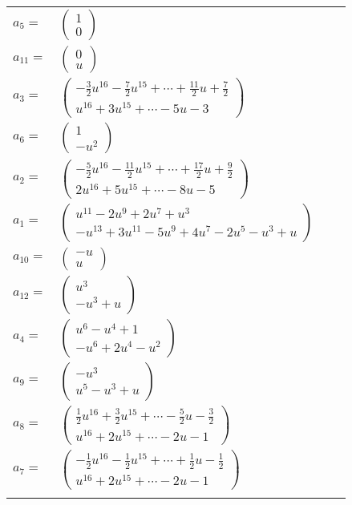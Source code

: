 \documentclass[1p]{elsarticle_modified}
\theoremstyle{definition}
\begin{document}
\begin{tabular}{m{7pt} m{180pt} m{7pt} m{180pt} }
\flushright $a_{5}=$&$\begin{pmatrix}1\\0\end{pmatrix}$ \\
\flushright $a_{11}=$&$\begin{pmatrix}0\\u\end{pmatrix}$ \\
\flushright $a_{3}=$&$\begin{pmatrix}-\frac{3}{2} u^{16}-\frac{7}{2} u^{15}+\cdots+\frac{11}{2} u+\frac{7}{2}\\u^{16}+3 u^{15}+\cdots-5 u-3\end{pmatrix}$ \\
\flushright $a_{6}=$&$\begin{pmatrix}1\\- u^2\end{pmatrix}$ \\
\flushright $a_{2}=$&$\begin{pmatrix}-\frac{5}{2} u^{16}-\frac{11}{2} u^{15}+\cdots+\frac{17}{2} u+\frac{9}{2}\\2 u^{16}+5 u^{15}+\cdots-8 u-5\end{pmatrix}$ \\
\flushright $a_{1}=$&$\begin{pmatrix}u^{11}-2 u^9+2 u^7+u^3\\- u^{13}+3 u^{11}-5 u^9+4 u^7-2 u^5- u^3+u\end{pmatrix}$ \\
\flushright $a_{10}=$&$\begin{pmatrix}- u\\u\end{pmatrix}$ \\
\flushright $a_{12}=$&$\begin{pmatrix}u^3\\- u^3+u\end{pmatrix}$ \\
\flushright $a_{4}=$&$\begin{pmatrix}u^6- u^4+1\\- u^6+2 u^4- u^2\end{pmatrix}$ \\
\flushright $a_{9}=$&$\begin{pmatrix}- u^3\\u^5- u^3+u\end{pmatrix}$ \\
\flushright $a_{8}=$&$\begin{pmatrix}\frac{1}{2} u^{16}+\frac{3}{2} u^{15}+\cdots-\frac{5}{2} u-\frac{3}{2}\\u^{16}+2 u^{15}+\cdots-2 u-1\end{pmatrix}$ \\
\flushright $a_{7}=$&$\begin{pmatrix}-\frac{1}{2} u^{16}-\frac{1}{2} u^{15}+\cdots+\frac{1}{2} u-\frac{1}{2}\\u^{16}+2 u^{15}+\cdots-2 u-1\end{pmatrix}$\\&\end{tabular}
\end{document}
